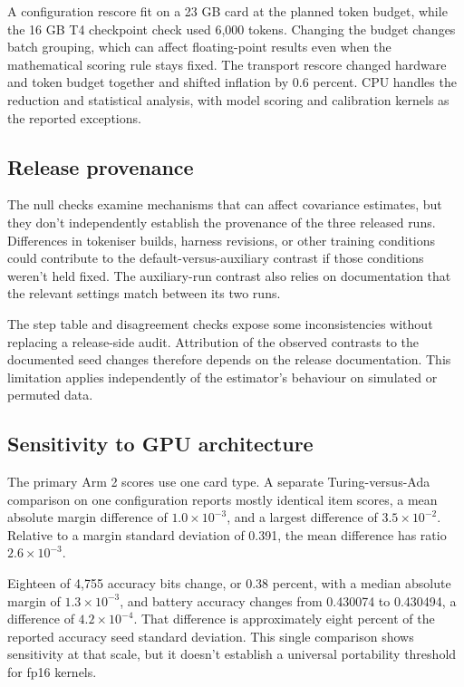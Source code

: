 A configuration rescore fit on a 23 GB card at the planned token budget, while the 16 GB T4 checkpoint check used 6,000 tokens. Changing the budget changes batch grouping, which can affect floating-point results even when the mathematical scoring rule stays fixed. The transport rescore changed hardware and token budget together and shifted inflation by 0.6 percent. CPU handles the reduction and statistical analysis, with model scoring and calibration kernels as the reported exceptions.

\subsection{Release provenance}
The null checks examine mechanisms that can affect covariance estimates, but they don't independently establish the provenance of the three released runs. Differences in tokeniser builds, harness revisions, or other training conditions could contribute to the default-versus-auxiliary contrast if those conditions weren't held fixed. The auxiliary-run contrast also relies on documentation that the relevant settings match between its two runs.

The step table and disagreement checks expose some inconsistencies without replacing a release-side audit. Attribution of the observed contrasts to the documented seed changes therefore depends on the release documentation. This limitation applies independently of the estimator's behaviour on simulated or permuted data.

\subsection{Sensitivity to GPU architecture}
The primary Arm 2 scores use one card type. A separate Turing-versus-Ada comparison on one configuration reports mostly identical item scores, a mean absolute margin difference of $1.0\times10^{-3}$, and a largest difference of $3.5\times10^{-2}$. Relative to a margin standard deviation of 0.391, the mean difference has ratio $2.6\times10^{-3}$.

Eighteen of 4,755 accuracy bits change, or 0.38 percent, with a median absolute margin of $1.3\times10^{-3}$, and battery accuracy changes from 0.430074 to 0.430494, a difference of $4.2\times10^{-4}$. That difference is approximately eight percent of the reported accuracy seed standard deviation. This single comparison shows sensitivity at that scale, but it doesn't establish a universal portability threshold for fp16 kernels.


